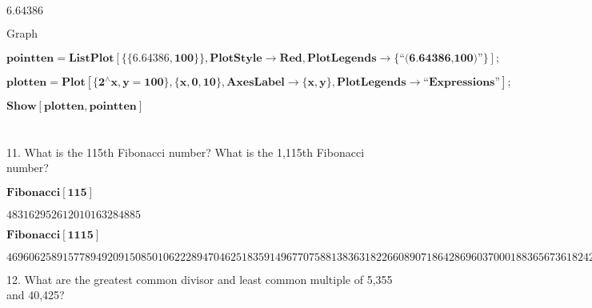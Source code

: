 \documentclass{article}
\begin{document}
\begin{doublespace}
\noindent\(6.64386\)
\end{doublespace}

Graph

\begin{doublespace}
\noindent\(\pmb{\text{pointten}=\text{ListPlot}[\{\{6.64386,100\}\},\text{PlotStyle}\to \text{Red},\text{PlotLegends}\to \{\text{{``}(6.64386,100){''}}\}];}\)
\end{doublespace}

\begin{doublespace}
\noindent\(\pmb{\text{plotten}=\text{Plot}[\{2{}^{\wedge}x,y=100\},\{x,0,10\}, \text{AxesLabel}\to \{\text{x},\text{y}\}, \text{PlotLegends}\to \text{{``}Expressions{''}}];}\)
\end{doublespace}

\begin{doublespace}
\noindent\(\pmb{\text{Show}[\text{plotten},\text{pointten}]}\)
\end{doublespace}

\begin{doublespace}
\noindent\(\begin{array}{cc}
  &  \\
\end{array}\)
\end{doublespace}

11. What is the 115th Fibonacci number? What is the 1,115th Fibonacci number?\\


\begin{doublespace}
\noindent\(\pmb{\text{Fibonacci}[115]}\)
\end{doublespace}

\begin{doublespace}
\noindent\(483162952612010163284885\)
\end{doublespace}

\begin{doublespace}
\noindent\(\pmb{\text{Fibonacci}[1115]}\)
\end{doublespace}

\begin{doublespace}
\noindent\(46960625891577894920915085010622289470462518359149677075881383631822660890718642869603700018836567361824279444479341088310462978732670769895389845153583927059046832024176024794070671098298816588315827802770672734166457585412100971385\)
\end{doublespace}

12. What are the greatest common divisor and least common multiple of 5,355 and 40,425?\\
\end{document}
